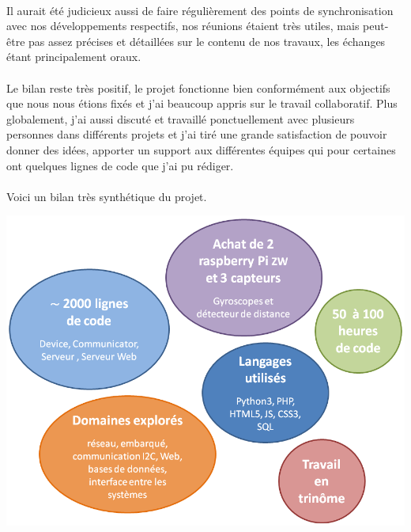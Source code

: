 \documentclass[12pt]{article}
\begin{document}
	\paragraph{}
	Il aurait été judicieux aussi de faire régulièrement des points de synchronisation avec nos développements respectifs, nos réunions étaient très utiles, mais peut-être pas assez précises et détaillées sur le contenu de nos travaux, les échanges étant principalement oraux.
	
	
	\paragraph{}
	Le bilan reste très positif, le projet fonctionne bien conformément aux objectifs que nous nous étions fixés et j'ai beaucoup appris sur le travail collaboratif. Plus globalement, j'ai aussi discuté et travaillé ponctuellement avec plusieurs personnes dans différents projets et j'ai tiré une grande satisfaction de pouvoir donner des idées, apporter un support aux différentes équipes qui pour certaines ont quelques lignes de code que j'ai pu rédiger.
	
	\paragraph{}
	Voici un bilan très synthétique du projet.
	
	\vspace{1cm}
	\noindent
	\includegraphics[width=\textwidth]{bilan}
	\vspace{1cm}
	
\end{document}

